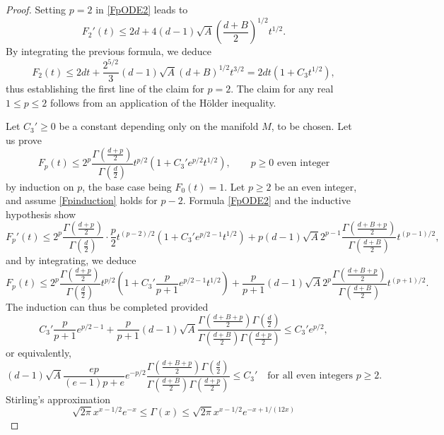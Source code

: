 \documentclass[11pt,a4paper]{article}
\theoremstyle{definition}
\begin{document}
\begin{proof}
Setting $p=2$ in \eqref{FpODE2} leads to
\[ F_2'(t) \le 2d+ 4 (d-1) \sqrt{A} \left( \frac{d+B}{2} \right)^{1/2}t^{1/2}. \]
By integrating the previous formula, we deduce
\[ F_2(t) \le 2dt + \frac{2^{5/2}}{3}(d-1) \sqrt{A} (d+B)^{1/2} t^{3/2} = 2dt \left( 1+C_3 t^{1/2} \right) , \]
thus establishing the first line of the claim for $p=2$. The claim for any real $1 \le p \le 2$ follows from an application of the H\"older inequality.

Let $C_3' \ge 0$ be a constant depending only on the manifold $M$, to be chosen. Let us prove
\begin{equation}\label{Fpinduction}
F_p (t) \le 2^p \frac{\Gamma \left( \frac{d+p}{2} \right)}{\Gamma \left( \frac{d}{2} \right)} t^{p/2} \left( 1+C_3'  e^{p/2} t^{1/2} \right), \qquad p \ge 0 \textrm{ even integer}
\end{equation}
by induction on $p$, the base case being $F_0(t)=1$. Let $p \ge 2$ be an even integer, and assume \eqref{Fpinduction} holds for $p-2$. Formula \eqref{FpODE2} and the inductive hypothesis show
\[ F_p'(t) \le 2^p \frac{\Gamma \left( \frac{d+p}{2} \right)}{\Gamma \left( \frac{d}{2} \right)} \cdot \frac{p}{2} t^{(p-2)/2} \left( 1+C_3'  e^{p/2-1} t^{1/2} \right) + p (d-1) \sqrt{A} 2^{p-1} \frac{\Gamma \left( \frac{d+B+p}{2} \right)}{\Gamma \left( \frac{d+B}{2} \right)} t^{(p-1)/2}, \]
and by integrating, we deduce
\[ F_p(t) \le 2^p \frac{\Gamma \left( \frac{d+p}{2} \right)}{\Gamma \left( \frac{d}{2} \right)} t^{p/2} \left(1+C_3' \frac{p}{p+1} e^{p/2-1} t^{1/2} \right) + \frac{p}{p+1} (d-1) \sqrt{A} 2^p \frac{\Gamma \left( \frac{d+B+p}{2} \right)}{\Gamma \left( \frac{d+B}{2} \right)} t^{(p+1)/2} . \]
The induction can thus be completed provided
\[ C_3'  \frac{p}{p+1} e^{p/2-1} + \frac{p}{p+1} (d-1) \sqrt{A} \frac{\Gamma \left( \frac{d+B+p}{2} \right) \Gamma \left( \frac{d}{2} \right)}{\Gamma \left( \frac{d+B}{2} \right) \Gamma \left( \frac{d+p}{2} \right)} \le C_3' e^{p/2} , \]
or equivalently,
\begin{equation}\label{C3condition}
(d-1) \sqrt{A} \frac{ep}{(e-1)p+e} e^{-p/2} \frac{\Gamma \left( \frac{d+B+p}{2} \right) \Gamma \left( \frac{d}{2} \right)}{\Gamma \left( \frac{d+B}{2} \right) \Gamma \left( \frac{d+p}{2} \right)} \le C_3' \quad \textrm{for all even integers } p \ge 2.
\end{equation}
Stirling's approximation
\begin{equation}\label{stirling}
\sqrt{2 \pi} x^{x-1/2} e^{-x} \le \Gamma (x) \le \sqrt{2 \pi} x^{x-1/2} e^{-x+1/(12x)}
\end{equation}

\end{proof}
\end{document}
